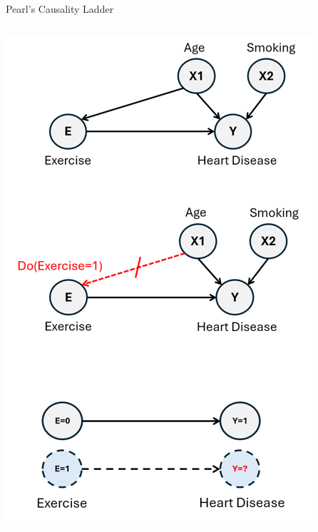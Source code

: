 \documentclass[onlytextwidth,english]{beamer}\usepackage[]{graphicx}\usepackage[]{xcolor}
\begin{document}
\begin{frame}{Pearl's Causality Ladder}
\begin{columns}
\begin{column}{0.40\textwidth}
\includegraphics[width=1\linewidth]{img/Pearls_Ladder.png}
\end{column}

\end{columns}

\end{frame}
\end{document}
